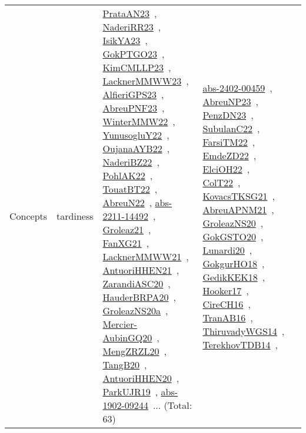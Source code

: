 {\begin{longtable}{lp{3cm}>{\raggedright\arraybackslash}p{6cm}>{\raggedright\arraybackslash}p{6cm}>{\raggedright\arraybackslash}p{8cm}}
Concepts & tardiness & \href{../works/PrataAN23.pdf}{PrataAN23}~\cite{PrataAN23}, \href{../works/NaderiRR23.pdf}{NaderiRR23}~\cite{NaderiRR23}, \href{../works/IsikYA23.pdf}{IsikYA23}~\cite{IsikYA23}, \href{../works/GokPTGO23.pdf}{GokPTGO23}~\cite{GokPTGO23}, \href{../works/KimCMLLP23.pdf}{KimCMLLP23}~\cite{KimCMLLP23}, \href{../works/LacknerMMWW23.pdf}{LacknerMMWW23}~\cite{LacknerMMWW23}, \href{../works/AlfieriGPS23.pdf}{AlfieriGPS23}~\cite{AlfieriGPS23}, \href{../works/AbreuPNF23.pdf}{AbreuPNF23}~\cite{AbreuPNF23}, \href{../works/WinterMMW22.pdf}{WinterMMW22}~\cite{WinterMMW22}, \href{../works/YunusogluY22.pdf}{YunusogluY22}~\cite{YunusogluY22}, \href{../works/OujanaAYB22.pdf}{OujanaAYB22}~\cite{OujanaAYB22}, \href{../works/NaderiBZ22.pdf}{NaderiBZ22}~\cite{NaderiBZ22}, \href{../works/PohlAK22.pdf}{PohlAK22}~\cite{PohlAK22}, \href{../works/TouatBT22.pdf}{TouatBT22}~\cite{TouatBT22}, \href{../works/AbreuN22.pdf}{AbreuN22}~\cite{AbreuN22}, \href{../works/abs-2211-14492.pdf}{abs-2211-14492}~\cite{abs-2211-14492}, \href{../works/Groleaz21.pdf}{Groleaz21}~\cite{Groleaz21}, \href{../works/FanXG21.pdf}{FanXG21}~\cite{FanXG21}, \href{../works/LacknerMMWW21.pdf}{LacknerMMWW21}~\cite{LacknerMMWW21}, \href{../works/AntuoriHHEN21.pdf}{AntuoriHHEN21}~\cite{AntuoriHHEN21}, \href{../works/ZarandiASC20.pdf}{ZarandiASC20}~\cite{ZarandiASC20}, \href{../works/HauderBRPA20.pdf}{HauderBRPA20}~\cite{HauderBRPA20}, \href{../works/GroleazNS20a.pdf}{GroleazNS20a}~\cite{GroleazNS20a}, \href{../works/Mercier-AubinGQ20.pdf}{Mercier-AubinGQ20}~\cite{Mercier-AubinGQ20}, \href{../works/MengZRZL20.pdf}{MengZRZL20}~\cite{MengZRZL20}, \href{../works/TangB20.pdf}{TangB20}~\cite{TangB20}, \href{../works/AntuoriHHEN20.pdf}{AntuoriHHEN20}~\cite{AntuoriHHEN20}, \href{../works/ParkUJR19.pdf}{ParkUJR19}~\cite{ParkUJR19}, \href{../works/abs-1902-09244.pdf}{abs-1902-09244}~\cite{abs-1902-09244}... (Total: 63) & \href{../works/abs-2402-00459.pdf}{abs-2402-00459}~\cite{abs-2402-00459}, \href{../works/AbreuNP23.pdf}{AbreuNP23}~\cite{AbreuNP23}, \href{../works/PenzDN23.pdf}{PenzDN23}~\cite{PenzDN23}, \href{../works/SubulanC22.pdf}{SubulanC22}~\cite{SubulanC22}, \href{../works/FarsiTM22.pdf}{FarsiTM22}~\cite{FarsiTM22}, \href{../works/EmdeZD22.pdf}{EmdeZD22}~\cite{EmdeZD22}, \href{../works/ElciOH22.pdf}{ElciOH22}~\cite{ElciOH22}, \href{../works/ColT22.pdf}{ColT22}~\cite{ColT22}, \href{../works/KovacsTKSG21.pdf}{KovacsTKSG21}~\cite{KovacsTKSG21}, \href{../works/AbreuAPNM21.pdf}{AbreuAPNM21}~\cite{AbreuAPNM21}, \href{../works/GroleazNS20.pdf}{GroleazNS20}~\cite{GroleazNS20}, \href{../works/GokGSTO20.pdf}{GokGSTO20}~\cite{GokGSTO20}, \href{../works/Lunardi20.pdf}{Lunardi20}~\cite{Lunardi20}, \href{../works/GokgurHO18.pdf}{GokgurHO18}~\cite{GokgurHO18}, \href{../works/GedikKEK18.pdf}{GedikKEK18}~\cite{GedikKEK18}, \href{../works/Hooker17.pdf}{Hooker17}~\cite{Hooker17}, \href{../works/CireCH16.pdf}{CireCH16}~\cite{CireCH16}, \href{../works/TranAB16.pdf}{TranAB16}~\cite{TranAB16}, \href{../works/ThiruvadyWGS14.pdf}{ThiruvadyWGS14}~\cite{ThiruvadyWGS14}, \href{../works/TerekhovTDB14.pdf}{TerekhovTDB14}~\cite{TerekhovTDB14}, 
\end{longtable}}
